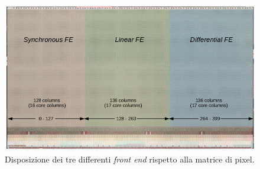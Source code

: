 \begin{figure}
\centering
\includegraphics[scale=.3]{Immagini/FrontEnd}
\caption{Disposizione dei tre differenti \textit{front end} rispetto alla matrice di pixel.}
\label{FrontEnd}
\end{figure}




